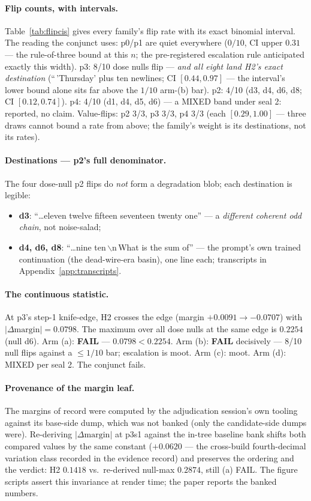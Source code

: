 \paragraph{Flip counts, with intervals.}
Table~\ref{tab:flipcis} gives every family's flip rate with its
exact binomial interval. The reading the conjunct uses: p0/p1 are
quiet everywhere ($0/10$, CI upper $0.31$ --- the rule-of-three
bound at this $n$; the pre-registered escalation rule anticipated
exactly this width). p3: 8/10 dose nulls flip --- \emph{and all
eight land H2's exact destination} (``\,'Thursday' plus ten
newlines; CI $[0.44, 0.97]$ --- the interval's lower bound alone sits
far above the $1/10$ arm-(b) bar). p2: 4/10 (d3, d4, d6, d8; CI
$[0.12, 0.74]$). p4: 4/10 (d1, d4, d5, d6) --- a MIXED band under
seal 2: reported, no claim. Value-flips: p2 3/3, p3 3/3, p4 3/3
(each $[0.29, 1.00]$ --- three draws cannot bound a rate from
above; the family's weight is its destinations, not its rates).

\paragraph{Destinations --- p2's full denominator.}
The four dose-null p2 flips do \emph{not} form a degradation blob;
each destination is legible:
\begin{itemize}
\item \textbf{d3}: ``\ldots eleven twelve fifteen seventeen twenty
  one'' --- a \emph{different coherent odd chain}, not noise-salad;
\item \textbf{d4, d6, d8}: ``\ldots nine ten\,$\backslash$n\,What is
  the sum of'' --- the prompt's own trained continuation (the
  dead-wire-era basin), one line each; transcripts in
  Appendix~\ref{app:transcripts}.
\end{itemize}

\paragraph{The continuous statistic.}
At p3's step-1 knife-edge, H2 crosses the edge (margin $+0.0091 \to
-0.0707$) with $|\Delta\mathrm{margin}| = 0.0798$. The maximum over
all dose nulls at the same edge is $0.2254$ (null d6). Arm (a):
\textbf{FAIL} --- $0.0798 < 0.2254$. Arm (b): \textbf{FAIL} decisively
--- 8/10 null flips against a $\le 1/10$ bar; escalation is moot.
Arm (c): moot. Arm (d): MIXED per seal 2. The conjunct fails.

\paragraph{Provenance of the margin leaf.}
The margins of record were computed by the adjudication session's
own tooling against its base-side dump, which was not banked (only
the candidate-side dumps were). Re-deriving $|\Delta\mathrm{margin}|$
at p3s1 against the in-tree baseline bank shifts both compared
values by the same constant ($+0.0620$ --- the cross-build
fourth-decimal variation class recorded in the evidence record) and
preserves the ordering and the verdict: H2 $0.1418$ vs.\ re-derived
null-max $0.2874$, still (a) FAIL. The figure scripts assert this
invariance at render time; the paper reports the banked numbers.


